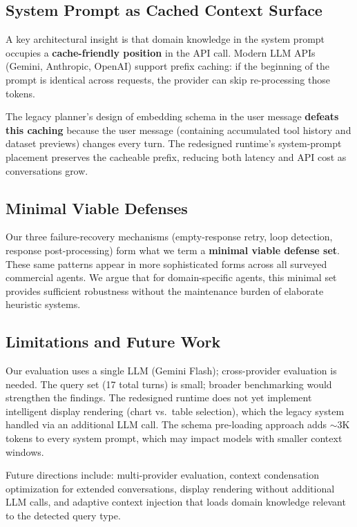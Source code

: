 \documentclass{article}
\begin{document}
\subsection{System Prompt as Cached Context Surface}

A key architectural insight is that domain knowledge in the system prompt occupies a \textbf{cache-friendly position} in the API call.
Modern LLM APIs (Gemini, Anthropic, OpenAI) support prefix caching: if the beginning of the prompt is identical across requests, the provider can skip re-processing those tokens.

The legacy planner's design of embedding schema in the user message \textbf{defeats this caching} because the user message (containing accumulated tool history and dataset previews) changes every turn.
The redesigned runtime's system-prompt placement preserves the cacheable prefix, reducing both latency and API cost as conversations grow.

\subsection{Minimal Viable Defenses}

Our three failure-recovery mechanisms (empty-response retry, loop detection, response post-processing) form what we term a \textbf{minimal viable defense set}.
These same patterns appear in more sophisticated forms across all surveyed commercial agents.
We argue that for domain-specific agents, this minimal set provides sufficient robustness without the maintenance burden of elaborate heuristic systems.

\subsection{Limitations and Future Work}

Our evaluation uses a single LLM (Gemini Flash); cross-provider evaluation is needed.
The query set (17 total turns) is small; broader benchmarking would strengthen the findings.
The redesigned runtime does not yet implement intelligent display rendering (chart vs.\ table selection), which the legacy system handled via an additional LLM call.
The schema pre-loading approach adds ${\sim}$3K tokens to every system prompt, which may impact models with smaller context windows.

Future directions include: multi-provider evaluation, context condensation optimization for extended conversations, display rendering without additional LLM calls, and adaptive context injection that loads domain knowledge relevant to the detected query type.
\end{document}
